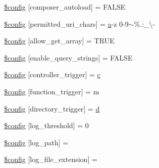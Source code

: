 \begin{DoxyCompactItemize}
\item 
\hyperlink{application_2config_2config_8php_ac8ab0111ebe9c372fb22c673ed923f0d}{\$config} \mbox{[}\textquotesingle{}composer\+\_\+autoload\textquotesingle{}\mbox{]} = F\+A\+L\+S\+E
\item 
\hyperlink{application_2config_2config_8php_ae2e36375b245287a8851ac04565994de}{\$config} \mbox{[}\textquotesingle{}permitted\+\_\+uri\+\_\+chars\textquotesingle{}\mbox{]} = \textquotesingle{}\hyperlink{assets_2js_2bootstrap_8min_8js_a1f5870dcf487187f13d5fd328ed9e6e7}{a}-\/z 0-\/9$\sim$\%.\+:\+\_\+\textbackslash{}-\/\textquotesingle{}
\item 
\hyperlink{application_2config_2config_8php_ac714a2702b430e47833d82d6ee590298}{\$config} \mbox{[}\textquotesingle{}allow\+\_\+get\+\_\+array\textquotesingle{}\mbox{]} = T\+R\+U\+E
\item 
\hyperlink{application_2config_2config_8php_a227b7a6fec0306454ffb0dead1f1c4f7}{\$config} \mbox{[}\textquotesingle{}enable\+\_\+query\+\_\+strings\textquotesingle{}\mbox{]} = F\+A\+L\+S\+E
\item 
\hyperlink{application_2config_2config_8php_a7ea9e139536f27af75812de53e852829}{\$config} \mbox{[}\textquotesingle{}controller\+\_\+trigger\textquotesingle{}\mbox{]} = \textquotesingle{}\hyperlink{assets_2js_2bootstrap_8min_8js_ad9d1ac02e33c4aed62ad517a7cb8b3fb}{c}\textquotesingle{}
\item 
\hyperlink{application_2config_2config_8php_acac6a7410b2ae72152894e3b93501811}{\$config} \mbox{[}\textquotesingle{}function\+\_\+trigger\textquotesingle{}\mbox{]} = \textquotesingle{}m\textquotesingle{}
\item 
\hyperlink{application_2config_2config_8php_af7e6593d4088b77d153dafff4567f143}{\$config} \mbox{[}\textquotesingle{}directory\+\_\+trigger\textquotesingle{}\mbox{]} = \textquotesingle{}\hyperlink{assets_2js_2bootstrap_8min_8js_aeb337d295abaddb5ec3cb34cc2e2bbc9}{d}\textquotesingle{}
\item 
\hyperlink{application_2config_2config_8php_a7e7fe9a5aa2c85e48865b154035dab6a}{\$config} \mbox{[}\textquotesingle{}log\+\_\+threshold\textquotesingle{}\mbox{]} = 0
\item 
\hyperlink{application_2config_2config_8php_aee8524f2388d21b1c73de5c48a82b687}{\$config} \mbox{[}\textquotesingle{}log\+\_\+path\textquotesingle{}\mbox{]} = \textquotesingle{}\textquotesingle{}
\item 
\hyperlink{application_2config_2config_8php_a393732deb535f26741ab9dcec545be0d}{\$config} \mbox{[}\textquotesingle{}log\+\_\+file\+\_\+extension\textquotesingle{}\mbox{]} = \textquotesingle{}\textquotesingle{}

\end{DoxyCompactItemize}
